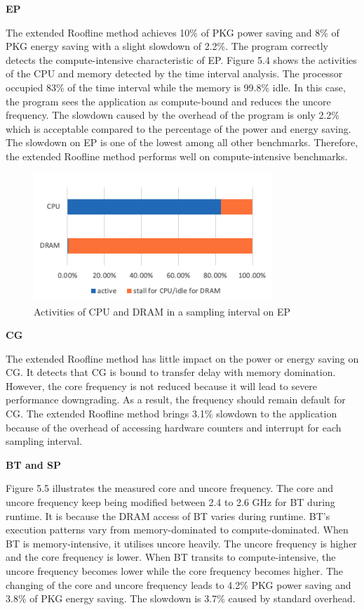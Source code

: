 \textbf{EP}

The extended Roofline method achieves 10\% of PKG power saving and 8\% of PKG energy saving with a slight slowdown of 2.2\%. The program correctly detects the compute-intensive characteristic of EP. Figure 5.4 shows the activities of the CPU and memory detected by the time interval analysis. The processor occupied 83\% of the time interval while the memory is 99.8\% idle. In this case, the program sees the application as compute-bound and reduces the uncore frequency. The slowdown caused by the overhead of the program is only 2.2\% which is acceptable compared to the percentage of the power and energy saving. The slowdown on EP is one of the lowest among all other benchmarks. Therefore, the extended Roofline method performs well on compute-intensive benchmarks.

\begin{figure} [h] %
	\centering   %
	\includegraphics[width=9cm]{pictures/timeforep}
	\caption{Activities of CPU and DRAM in a sampling interval on EP}
\end{figure}

\textbf{CG}

The extended Roofline method has little impact on the power or energy saving on CG. It detects that CG is bound to transfer delay with memory domination. However, the core frequency is not reduced because it will lead to severe performance downgrading. As a result, the frequency should remain default for CG.  The extended Roofline method brings 3.1\% slowdown to the application because of the overhead of accessing hardware counters and interrupt for each sampling interval.

\textbf{BT and SP}

Figure 5.5 illustrates the measured core and uncore frequency. The core and uncore frequency keep being modified between 2.4 to 2.6 GHz for BT during runtime. It is because the DRAM access of BT varies during runtime. BT's execution patterns vary from memory-dominated to compute-dominated. When BT is memory-intensive, it utilises uncore heavily. The uncore frequency is higher and the core frequency is lower. When BT transits to compute-intensive, the uncore frequency becomes lower while the core frequency becomes higher. The changing of the core and uncore frequency leads to  4.2\% PKG power saving and 3.8\% of PKG energy saving. The slowdown is 3.7\% caused by standard overhead.


